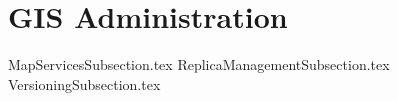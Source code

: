 \documentclass{book}
\title{}  %
\begin{document}
\ifstandalone
\maketitle %
\clearpage
\tableofcontents %
\clearpage
\fi


% 
\section{GIS Administration}

{MapServicesSubsection.tex}
{ReplicaManagementSubsection.tex}
{VersioningSubsection.tex}
\end{document}
